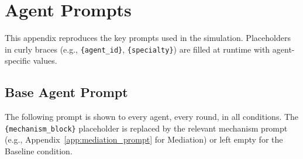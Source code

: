 \documentclass{article}
\begin{document}
\appendix

\section{Agent Prompts}
\label{app:prompts}

This appendix reproduces the key prompts used in the simulation. Placeholders in curly braces (e.g., \texttt{\{agent\_id\}}, \texttt{\{specialty\}}) are filled at runtime with agent-specific values.

\subsection{Base Agent Prompt}
\label{app:base_prompt}

The following prompt is shown to every agent, every round, in all conditions. The \texttt{\{mechanism\_block\}} placeholder is replaced by the relevant mechanism prompt (e.g., Appendix~\ref{app:mediation_prompt} for Mediation) or left empty for the Baseline condition.
\end{document}
